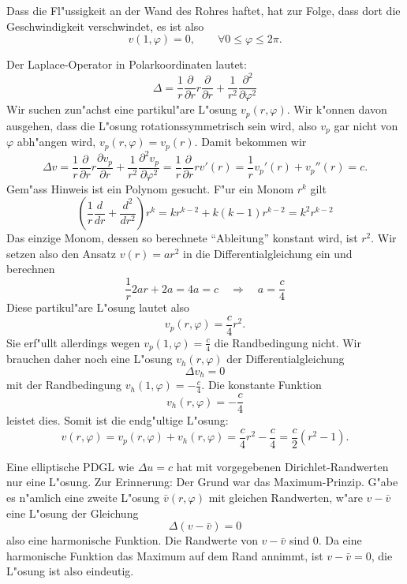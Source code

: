 \begin{loesung}
\begin{teilaufgaben}
\item Dass die Fl"ussigkeit an der Wand des Rohres haftet, hat zur
Folge, dass dort die Geschwindigkeit verschwindet, es ist also
\[
v(1,\varphi)=0,\qquad\forall 0\le \varphi\le 2\pi.
\]
\item Der Laplace-Operator in Polarkoordinaten lautet:
\[
\Delta
=
\frac1r\frac{\partial}{\partial r}r\frac{\partial}{\partial r}
+\frac1{r^2}\frac{\partial^2}{\partial\varphi^2}
\]
Wir suchen zun"achst eine partikul"are L"osung $v_p(r,\varphi)$.
Wir k"onnen davon ausgehen, dass die L"osung rotationssymmetrisch
sein wird, also $v_p$ gar nicht von $\varphi$ abh"angen wird,
$v_p(r,\varphi)=v_p(r)$. Damit bekommen wir
\[
\Delta v=
\frac1r\frac{\partial}{\partial r}r
\frac{\partial v_p}{\partial r}
+\frac1{r^2}\frac{\partial^2v_p}{\partial\varphi^2}
=
\frac1r\frac{\partial}{\partial r}rv'(r)
=
\frac1rv_p'(r)+v_p''(r)=c.
\]
Gem"ass Hinweis ist ein Polynom gesucht. F"ur ein Monom $r^k$
gilt
\[
\left(\frac1r\frac{d}{dr}+\frac{d^2}{dr^2}\right)r^k
=kr^{k-2}+k(k-1)r^{k-2}
=k^2 r^{k-2}
\]
Das einzige Monom, dessen so berechnete ``Ableitung'' konstant wird, ist
$r^2$.
Wir
setzen also den Ansatz $v(r)=ar^2$
in die Differentialgleichung ein und berechnen
\[
\frac1r2ar+2a
=
4a
=c
\quad
\Rightarrow
\quad
a=\frac{c}{4}
\]
Diese partikul"are L"osung lautet also
\[
v_p(r,\varphi)=\frac{c}{4}r^2.
\]
Sie erf"ullt allerdings wegen $v_p(1,\varphi)=\frac{c}{4}$ die
Randbedingung nicht. Wir brauchen daher noch eine
L"osung $v_h(r,\varphi)$ der Differentialgleichung
\[
\Delta v_h=0
\]
mit der Randbedingung $v_h(1,\varphi)=-\frac{c}{4}$. Die konstante
Funktion
\[
v_h(r,\varphi)=-\frac{c}{4}
\]
leistet dies. Somit ist die endg"ultige L"osung:
\[
v(r,\varphi)=v_p(r,\varphi)+v_h(r,\varphi)=\frac{c}{4}r^2 -\frac{c}{4}=
\frac{c}{2}(r^2-1).
\]
\item Eine elliptische PDGL wie $\Delta u=c$ hat mit vorgegebenen
Dirichlet-Randwerten nur eine L"osung. Zur Erinnerung: Der Grund
war das Maximum-Prinzip.
G"abe es n"amlich eine zweite L"osung $\bar v(r,\varphi)$ mit gleichen
Randwerten, w"are
$v-\bar v$ eine L"osung der Gleichung
\[
\Delta (v-\bar v)=0
\]
also eine harmonische Funktion. Die Randwerte von $v-\bar v$ sind $0$.
Da eine harmonische Funktion das Maximum auf dem Rand annimmt, ist
$v-\bar v=0$, die  L"osung ist also eindeutig.
\end{teilaufgaben}
\end{loesung}
